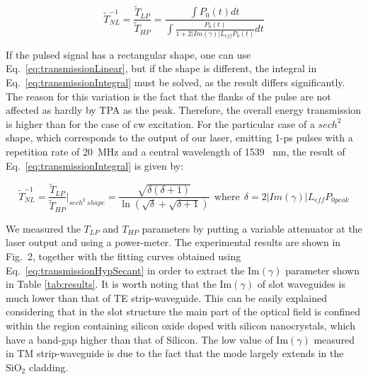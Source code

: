 \documentclass[10pt,letterpaper]{article}
\begin{document}
                                                                \begin{equation}
                                                                        \tilde{T}_{NL}^{-1} = \frac{\tilde{T}_{LP}}{\tilde{T}_{HP}} = \frac{\int P_0(t)dt}{\int \frac{P_0(t)}{1+2|Im(\gamma)| L_{eff} P_0(t)} dt}
                                                                        \label{eq:transmissionIntegral}
                                                                \end{equation}

If the pulsed signal has a rectangular shape, one can use Eq.~\ref{eq:transmissionLinear}, but if the shape is different, the integral in Eq.~\ref{eq:transmissionIntegral} must be solved, as the result differs significantly. The reason for this variation is the fact that the flanks of the pulse are not affected as hardly by TPA as the peak. Therefore, the overall energy transmission is higher than for the case of cw excitation. For the particular case of a $sech^2$ shape, which corresponds to the output of our laser, emitting 1-ps pulses with a repetition rate of 20~MHz and a central wavelength of 1539~ nm, the result of  Eq.~\ref{eq:transmissionIntegral} is given by:


                                                                \begin{equation}
                                                                        \tilde{T}_{NL}^{-1}  = \frac{\tilde{T}_{LP}}{\tilde{T}_{HP}} \bigg|_{sech^2~shape}  = \frac{\sqrt{\delta({\delta + 1})}}{\ln(\sqrt{\delta}+\sqrt{\delta+1})} ~~\mathrm{where}~~  \delta = 2|Im(\gamma)| L_{eff} P_{0 peak}
                                                                        \label{eq:transmissionHypSecant}
                                                                \end{equation}


We measured the $T_{LP}$ and $T_{HP}$ parameters by putting a variable attenuator at the laser output and using a power-meter. The experimental results are shown in Fig.~2, together with the fitting curves obtained using Eq.~\ref{eq:transmissionHypSecant} in order to extract the Im$(\gamma)$ parameter shown in Table \ref{tab:results}. 
It is worth noting that the Im$(\gamma )$ of slot waveguides is much lower than that of TE strip-waveguide. This can be easily explained considering that in the slot structure the main part of the optical field is confined within the region containing silicon oxide doped with silicon nanocrystals, which have a band-gap higher than that of Silicon. The low value of Im$(\gamma)$ measured in TM strip-waveguide is due to the fact that  the mode largely extends in the $\mathrm{SiO_2}$ cladding. 
\end{document}
